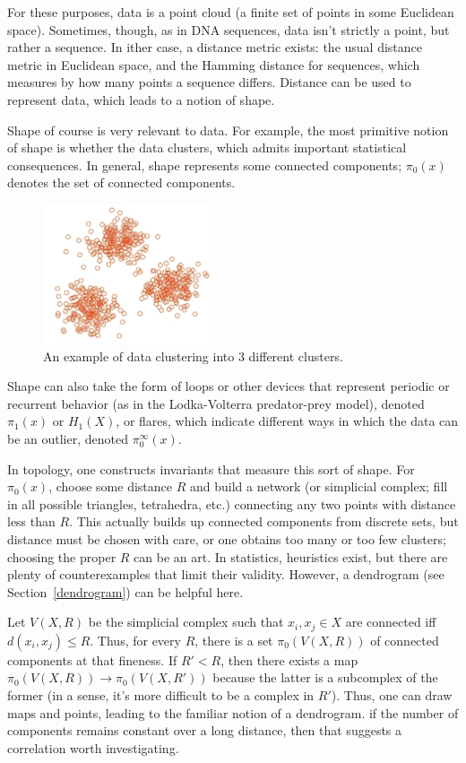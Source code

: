 For these purposes, data is a point cloud (a finite set of points in some Euclidean space). Sometimes, though, as in DNA sequences, data isn't strictly a point, but rather a sequence. In ither case, a distance metric exists: the usual distance metric in Euclidean space, and the Hamming distance for sequences, which measures by how many points a sequence differs. Distance can be used to represent data, which leads to a notion of shape.

Shape of course is very relevant to data. For example, the most primitive notion of shape is whether the data clusters, which admits important statistical consequences. In general, shape represents some connected components; $\pi_0(x)$ denotes the set of connected components.
\begin{figure}[h!]
\centering
\includegraphics[width=2in]{clustering}
\caption{An example of data clustering into 3 different clusters.}
\end{figure}
Shape can also take the form of loops or other devices that represent periodic or recurrent behavior (as in the Lodka-Volterra predator-prey model), denoted $\pi_1(x)$ or $H_1(X)$, or flares, which indicate different ways in which the data can be an outlier, denoted $\pi_0^\infty(x)$.

In topology, one constructs invariants that measure this sort of shape. For $\pi_0(x)$, choose some distance $R$ and build a network (or simplicial complex; fill in all possible triangles, tetrahedra, etc.) connecting any two points with distance less than $R$. This actually builds up connected components from discrete sets, but distance must be chosen with care, or one obtains too many or too few clusters; choosing the proper $R$ can be an art. In statistics, heuristics exist, but there are plenty of counterexamples that limit their validity. However, a dendrogram (see Section~\ref{dendrogram}) can be helpful here.

Let $V(X,R)$ be the simplicial complex such that $x_i,x_j\in X$ are connected iff $d(x_i,x_j) \le R$. Thus, for every $R$, there is a set $\pi_0(V(X,R))$ of connected components at that fineness. If $R'<R$, then there exists a map $\pi_0(V(X,R))\to \pi_0(V(X,R'))$ because the latter is a subcomplex of the former (in a sense, it's more difficult to be a complex in $R'$). Thus, one can draw maps and points, leading to the familiar notion of a dendrogram. if the number of components remains constant over a long distance, then that suggests a correlation worth investigating.

